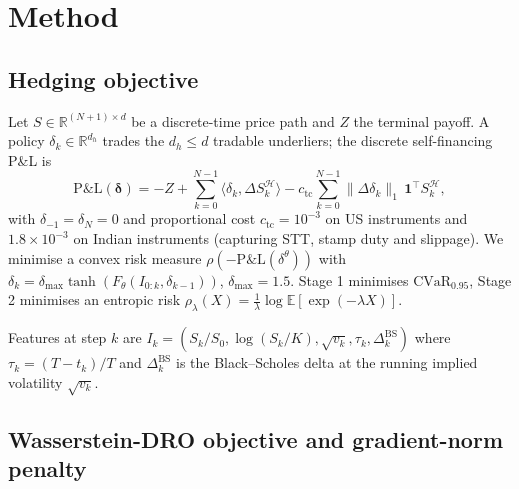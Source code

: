 \documentclass[11pt]{article}
\newcommand{\R}{\mathbb{R}}
\newcommand{\E}{\mathbb{E}}
\newcommand{\cvar}{\mathrm{CVaR}}
\newcommand{\Pnl}{\mathrm{P\&L}}
\begin{document}
\section{Method}
\label{sec:method}

\subsection{Hedging objective}

Let $S\in\R^{(N+1)\times d}$ be a discrete-time price path and $Z$ the terminal payoff.  A policy $\delta_k\in\R^{d_h}$ trades the $d_h\le d$ tradable underliers; the discrete self-financing P\&L is
\begin{equation}
\Pnl(\boldsymbol\delta) = -Z + \sum_{k=0}^{N-1}\langle\delta_k, \Delta S_k^{\mathcal H}\rangle - c_{\mathrm{tc}}\sum_{k=0}^{N-1}\|\Delta\delta_k\|_1\,\mathbf 1^\top S_k^{\mathcal H},
\label{eq:pnl}
\end{equation}
with $\delta_{-1}=\delta_N=0$ and proportional cost $c_{\mathrm{tc}}=10^{-3}$ on US instruments and $1.8\times 10^{-3}$ on Indian instruments (capturing STT, stamp duty and slippage).  We minimise a convex risk measure $\rho(-\Pnl(\delta^\theta))$ with $\delta_k = \delta_{\max}\tanh(F_\theta(I_{0:k},\delta_{k-1}))$, $\delta_{\max}=1.5$.  Stage 1 minimises $\cvar_{0.95}$, Stage 2 minimises an entropic risk $\rho_\lambda(X) = \tfrac{1}{\lambda}\log\E[\exp(-\lambda X)]$.

Features at step $k$ are $I_k = (S_k/S_0,\log(S_k/K),\sqrt{v_k},\tau_k,\Delta_k^{\mathrm{BS}})$ where $\tau_k=(T-t_k)/T$ and $\Delta_k^{\mathrm{BS}}$ is the Black--Scholes delta at the running implied volatility $\sqrt{v_k}$.

\subsection{Wasserstein-DRO objective and gradient-norm penalty}
\end{document}
